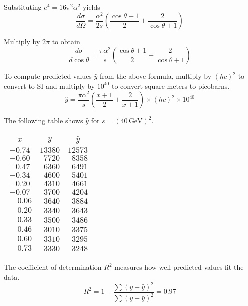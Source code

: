 \documentclass[12pt]{article}
\begin{document}
Substituting $e^4=16\pi^2\alpha^2$ yields
\begin{equation*}
\frac{d\sigma}{d\Omega}
=\frac{\alpha^2}{2s}
\left(
\frac{\cos\theta+1}{2}+\frac{2}{\cos\theta+1}
\right)
\end{equation*}

Multiply by $2\pi$ to obtain
\begin{equation*}
\frac{d\sigma}{d\cos\theta}
=\frac{\pi\alpha^2}{s}\left(
\frac{\cos\theta+1}{2}+\frac{2}{\cos\theta+1}
\right)
\end{equation*}

To compute predicted values $\hat{y}$ from the above formula,
multiply by $(hc)^2$ to convert to SI
and multiply by $10^{40}$ to convert square meters to picobarns.
\begin{equation*}
\hat{y}
=
\frac{\pi\alpha^2}{s}
\left(
\frac{x+1}{2}+
\frac{2}{x+1}
\right)
\times(hc)^2
\times10^{40}
\end{equation*}

The following table shows $\hat{y}$
for $s=(40\,\text{GeV})^2$.

\begin{center}
\begin{tabular}{|c|c|c|}
\hline
$x$ & $y$ & $\hat{y}$\\
\hline
$-0.74$ & $13380$ & $12573$\\
$-0.60$ & $\phantom{0}7720$ & $\phantom{0}8358$\\
$-0.47$ & $\phantom{0}6360$ & $\phantom{0}6491$\\
$-0.34$ & $\phantom{0}4600$ & $\phantom{0}5401$\\
$-0.20$ & $\phantom{0}4310$ & $\phantom{0}4661$\\
$-0.07$ & $\phantom{0}3700$ & $\phantom{0}4204$\\
$\phantom{+}0.06$ & $\phantom{0}3640$ & $\phantom{0}3884$\\
$\phantom{+}0.20$ & $\phantom{0}3340$ & $\phantom{0}3643$\\
$\phantom{+}0.33$ & $\phantom{0}3500$ & $\phantom{0}3486$\\
$\phantom{+}0.46$ & $\phantom{0}3010$ & $\phantom{0}3375$\\
$\phantom{+}0.60$ & $\phantom{0}3310$ & $\phantom{0}3295$\\
$\phantom{+}0.73$ & $\phantom{0}3330$ & $\phantom{0}3248$\\
\hline
\end{tabular}
\end{center}

The coefficient of determination $R^2$ measures how well predicted values fit the data.
\begin{equation*}
R^2=1-\frac{\sum(y-\hat{y})^2}{\sum(y-\bar{y})^2}=0.97
\end{equation*}
\end{document}
